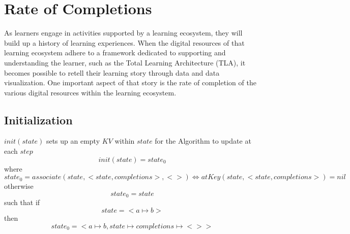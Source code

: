 \documentclass[../main.tex]{subfiles}
\begin{document}
\section{Rate of Completions}
As learners engage in activities supported by a learning ecosystem, they will build
up a history of learning experiences. When the digital resources of that learning ecosystem
adhere to a framework dedicated to supporting and understanding the
learner, such as the Total Learning Architecture (TLA), it becomes
possible to retell their learning story through data and data visualization. One important aspect of
that story is the rate of completion of the various digital resources within the learning ecosystem.

\subsection{Initialization}
$init(state)$ sets up an empty $KV$ within $state$ for the Algorithm to update at each $step$
$$init(state) = state_{0}$$
where
$$state_{0} = associate(state, <state, completions>, <>) \iff atKey(state, <state, completions>) = nil$$
otherwise
$$state_{0} = state$$
such that if
$$state = <a \mapsto b>$$
then
$$state_{0} = <a \mapsto b, state \mapsto completions \mapsto <>>$$
\end{document}
